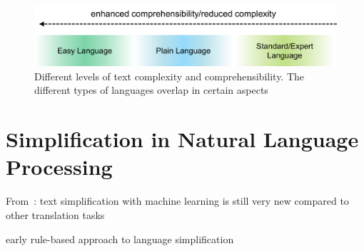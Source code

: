 \begin{figure}
    \centering
    \includegraphics[width=\linewidth]{images/easy_languages}
    \caption[Different levels of text complexity and comprehensibility.]{Different levels of text complexity and comprehensibility. The different types of languages overlap in certain aspects~\autocite{easyLanguageBook, selbsterstellt}}
    \label{fig:languages}
\end{figure}




%
%
%
%


%


%



\section{ Simplification in Natural Language Processing}\label{sec:langSimp}


From~\autocite{schomacker2023data}:
text simplification with machine learning is still very new compared to other translation tasks


early rule-based approach to language simplification~\autocite{suter2016}







